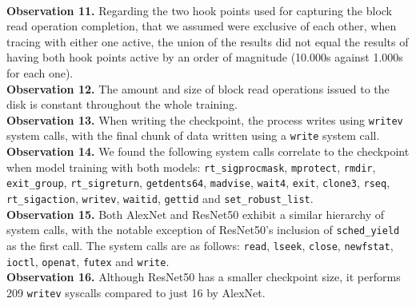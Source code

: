\documentclass[conference]{IEEEtran}
\begin{document}
\\
\textbf{Observation 11.} Regarding the two hook points used for capturing the block read operation completion, that we assumed were exclusive of each other, when tracing with either one active, the union of the results did not equal the results of having both hook points active by an order of magnitude (10.000s against 1.000s for each one).
\\
\textbf{Observation 12.} The amount and size of block read operations issued to the disk is constant throughout the whole training.
\\
\textbf{Observation 13.} When writing the checkpoint, the process writes using \texttt{writev} system calls, with the final chunk of data written using a \texttt{write} system call.
\\
\textbf{Observation 14.} We found the following system calls correlate to the checkpoint when model training with both models: \texttt{rt\_sigprocmask}, \texttt{mprotect}, \texttt{rmdir}, \texttt{exit\_group}, \texttt{rt\_sigreturn}, \texttt{getdents64}, \texttt{madvise}, \texttt{wait4}, \texttt{exit}, \texttt{clone3}, \texttt{rseq}, \texttt{rt\_sigaction}, \texttt{writev}, \texttt{waitid}, \texttt{gettid} and \texttt{set\_robust\_list}.
\\
\textbf{Observation 15.} Both AlexNet and ResNet50 exhibit a similar hierarchy of system calls, with the notable exception of ResNet50's inclusion of \texttt{sched\_yield} as the first call. The system calls are as follows: \texttt{read}, \texttt{lseek}, \texttt{close}, \texttt{newfstat}, \texttt{ioctl}, \texttt{openat}, \texttt{futex} and \texttt{write}.
\\
\textbf{Observation 16.} Although ResNet50 has a smaller checkpoint size, it performs 209 \texttt{writev} syscalls compared to just 16 by AlexNet.

\end{document}
